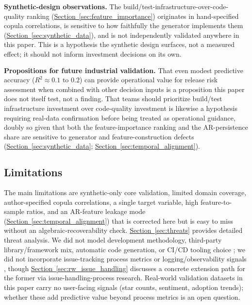 \documentclass[technologies,article,submit,pdftex,moreauthors]{Definitions/mdpi}
\begin{document}
\textbf{Synthetic-design observations.} The build/test-infrastructure-over-code-quality ranking (\hyperref[sec:feature_importance]{Section~\ref*{sec:feature_importance}}) originates in hand-specified copula correlations, is sensitive to how faithfully the generator implements them (\hyperref[sec:synthetic_data]{Section~\ref*{sec:synthetic_data}}), and is not independently validated anywhere in this paper. This is a hypothesis the synthetic design surfaces, not a measured effect; it should not inform investment decisions on its own.

\textbf{Propositions for future industrial validation.} That even modest predictive accuracy (\(R^2 \approx 0.1 \text{ to } 0.2\)) can provide operational value for release risk assessment when combined with other decision inputs is a proposition this paper does not itself test, not a finding. That teams should prioritize build/test infrastructure investment over code-quality investment is likewise a hypothesis requiring real-data confirmation before being treated as operational guidance, doubly so given that both the feature-importance ranking and the AR-persistence share are sensitive to generator and feature-construction defects (\hyperref[sec:synthetic_data]{Section~\ref*{sec:synthetic_data}}; \hyperref[sec:temporal_alignment]{Section~\ref*{sec:temporal_alignment}}).

\subsection{Limitations}\label{sec:limitations}

The main limitations are synthetic-only core validation, limited domain coverage, author-specified copula correlations, a single target variable, high feature-to-sample ratios, and an AR-feature leakage mode (\hyperref[sec:temporal_alignment]{Section~\ref*{sec:temporal_alignment}}) that is corrected here but is easy to miss without an algebraic-recoverability check. \hyperref[sec:threats]{Section~\ref*{sec:threats}} provides detailed threat analysis. We did not model development methodology, third-party library/framework mix, automatic code generation, or CI/CD tooling choice \citep{boehm2000, riungu2016}; we did not incorporate issue-tracking process metrics or logging/observability signals \citep{ostrand2002, dang2019}, though \hyperref[sec:rw_issue_handling]{Section~\ref*{sec:rw_issue_handling}} discusses a concrete extension path for the former via issue-handling-process research. Real-world validation datasets in this paper carry no user-facing signals (star counts, sentiment, adoption trends); whether these add predictive value beyond process metrics is an open question.
\end{document}
